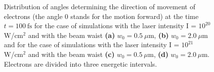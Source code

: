 \begin{figure}[h!]
	\caption{Distribution of angles determining the direction of movement of electrons (the angle 0 stands for the motion forward) at the time $ t = 100 \ \mathrm{fs} $ for the case of simulations with the laser intensity I = $ 10^{20} $ W/cm$^2$ and with the beam waist \textbf{(a)} $ w_0 = 0.5 \ \mu\mathrm{m} $, \textbf{(b)} $ w_0 = 2.0 \ \mu\mathrm{m} $ and for the case of simulations with the laser intensity I = $ 10^{21} $ W/cm$^2$ and with the beam waist \textbf{(c)} $ w_0 = 0.5 \ \mu\mathrm{m} $, \textbf{(d)} $ w_0 = 2.0 \ \mu\mathrm{m} $. Electrons are divided into three energetic intervals.}
	\label{fig:13}
\end{figure}

\begin{figure}[h!]
	\centering
	\hspace{1mm}
	\\[2mm]

\end{figure}
